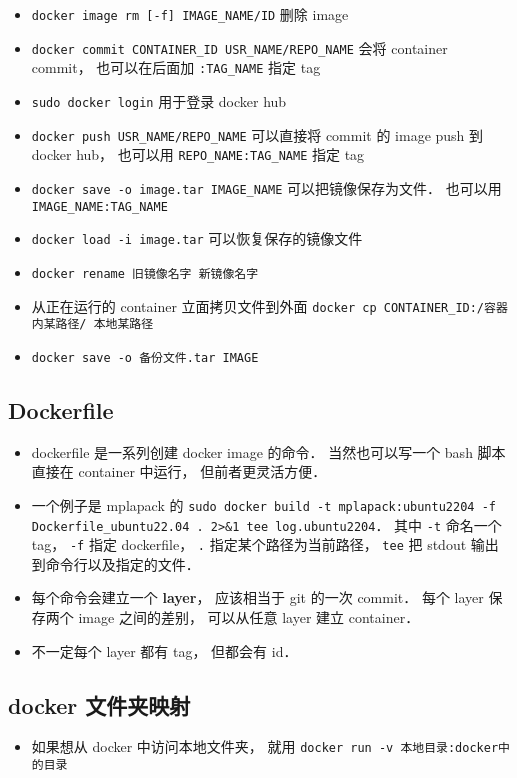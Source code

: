 \begin{itemize}
\item \verb`docker image rm [-f] IMAGE_NAME/ID` 删除 image
\item \verb`docker commit CONTAINER_ID USR_NAME/REPO_NAME` 会将 container commit， 也可以在后面加 \verb`:TAG_NAME` 指定 tag
\item \verb`sudo docker login` 用于登录 docker hub
\item \verb`docker push USR_NAME/REPO_NAME` 可以直接将 commit 的 image push 到 docker hub， 也可以用 \verb`REPO_NAME:TAG_NAME` 指定 tag
\item \verb|docker save -o image.tar IMAGE_NAME| 可以把镜像保存为文件． 也可以用 \verb|IMAGE_NAME:TAG_NAME|
\item \verb|docker load -i image.tar| 可以恢复保存的镜像文件
\item \verb|docker rename 旧镜像名字 新镜像名字|
\item 从正在运行的 container 立面拷贝文件到外面 \verb|docker cp CONTAINER_ID:/容器内某路径/ 本地某路径|
\item \verb|docker save -o 备份文件.tar IMAGE|
\end{itemize}

\subsection{Dockerfile}
\begin{itemize}
\item dockerfile 是一系列创建 docker image 的命令． 当然也可以写一个 bash 脚本直接在 container 中运行， 但前者更灵活方便．
\item 一个例子是 mplapack 的 \verb|sudo docker build -t mplapack:ubuntu2204 -f Dockerfile_ubuntu22.04 . 2>&1 tee log.ubuntu2204|． 其中 \verb|-t| 命名一个 tag， \verb|-f| 指定 dockerfile， \verb|.| 指定某个路径为当前路径， \verb|tee| 把 stdout 输出到命令行以及指定的文件．
\item 每个命令会建立一个 \textbf{layer}， 应该相当于 git 的一次 commit． 每个 layer 保存两个 image 之间的差别， 可以从任意 layer 建立 container．
\item 不一定每个 layer 都有 tag， 但都会有 id．
\end{itemize}

\subsection{docker 文件夹映射}
\begin{itemize}
\item 如果想从 docker 中访问本地文件夹， 就用 \verb|docker run -v 本地目录:docker中的目录|
\end{itemize}

